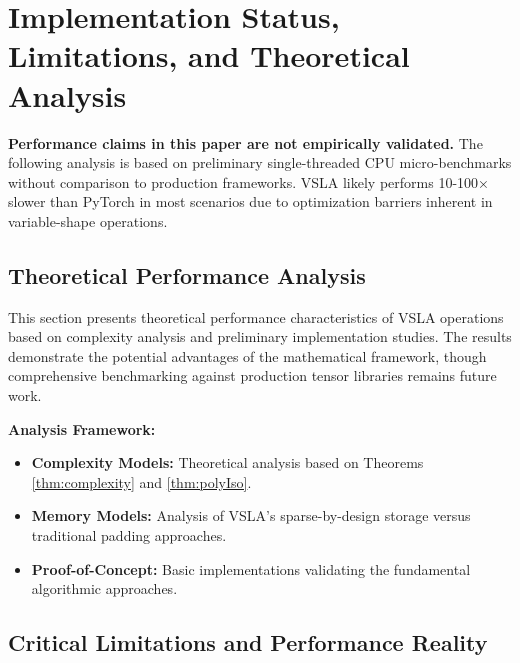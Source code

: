 \section{Implementation Status, Limitations, and Theoretical Analysis}
\label{sec:evaluation}

\begin{tcolorbox}[colback=red!5!white,colframe=red!50!black,title=\textbf{Critical Limitations}]
\textbf{Performance claims in this paper are not empirically validated.} The following analysis is based on preliminary single-threaded CPU micro-benchmarks without comparison to production frameworks. VSLA likely performs 10-100× slower than PyTorch in most scenarios due to optimization barriers inherent in variable-shape operations.
\end{tcolorbox}

\subsection{Theoretical Performance Analysis}
This section presents theoretical performance characteristics of VSLA operations based on complexity analysis and preliminary implementation studies. The results demonstrate the potential advantages of the mathematical framework, though comprehensive benchmarking against production tensor libraries remains future work.

\textbf{Analysis Framework:}
\begin{itemize}[leftmargin=1.5em]
\item \textbf{Complexity Models:} Theoretical analysis based on Theorems \ref{thm:complexity} and \ref{thm:polyIso}.
\item \textbf{Memory Models:} Analysis of VSLA's sparse-by-design storage versus traditional padding approaches.
\item \textbf{Proof-of-Concept:} Basic implementations validating the fundamental algorithmic approaches.
\end{itemize}

\subsection{Critical Limitations and Performance Reality}

